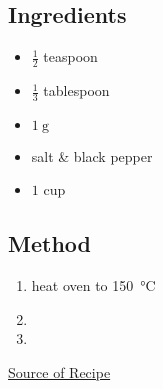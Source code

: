 \documentclass[11pt,a4paper]{article}
\begin{document}
\subsection*{Ingredients}

\begin{multicols}{2}

\begin{itemize}
  \item $ \frac{1}{2} $ teaspoon
  \item $ \frac{1}{3} $ tablespoon
  \item $ \qty{1}{\gram} $
  \item salt \& black pepper
\end{itemize}

\columnbreak{}

\begin{itemize}
  \item $ 1 $ cup
\end{itemize}

\end{multicols}

\medskip

\subsection*{Method}

\begin{enumerate}
  \item heat oven to \qty{150}{\celsius}
  \item \lipsum[2]
  \item \lipsum[3]
\end{enumerate}

\href{https://en.wikipedia.org/wiki/Recipe}{Source of Recipe}
\end{document}
